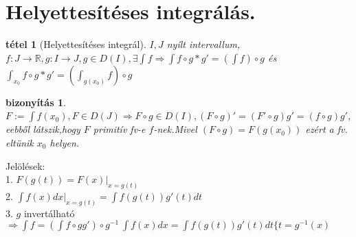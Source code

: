 \documentclass{article}
\newcommand{\R}{\mathbb{R}}
\newcommand{\n}{\rightarrow}
\newcommand{\nn}{\Rightarrow}
\newcommand{\di}{\displaystyle}
\theoremstyle{magyar}
\newtheorem{te}{tétel}[section]
\newtheorem{bi}{bizonyítás}[section]
\begin{document}
  \section{Helyettesítéses integrálás.}
  \begin{te}[Helyettesítéses integrál]
    $I,J$ nyílt intervallum, $f:J\n\R,g:I\n{J}, g\in D(I), \exists\di\int{f}\nn\int{f\circ{g}}*g'=(\int{f})\circ{g}$ és $\di\int_{x_0}{f\circ{g}}*g'=(\int_{g(x_0)}{f})\circ{g}$
  \end{te}
  \begin{bi}
    $F:=\di\int{f(x_0)}, F\in D(J)\nn F\circ{g}\in D(I), (F\circ{g})'=(F'\circ{g})g'=(f\circ{g})g'$, eebből látszik,hogy $F$ primitív fv-e $f$-nek.Mivel $(F\circ{g})=F(g(x_0))$ ezért a fv. eltünik $x_0$ helyen.
    
  \end{bi}
  Jelölések:\\
  1. $F(g(t))=F(x)|_{x=g(t)}$\\
  2. $\di\int{f(x)dx}|_{x=g(t)}=\int{f(g(t))g'(t)dt}$\\
  3. $g$ invertálható$\nn\int{f}=(\int{f\circ{g}g'})\circ{g^{-1}}\ \int{f(x)dx}=\int{f(g(t))g'(t)dt\{t=g^{-1}(x)}$
  \newpage
\end{document}
